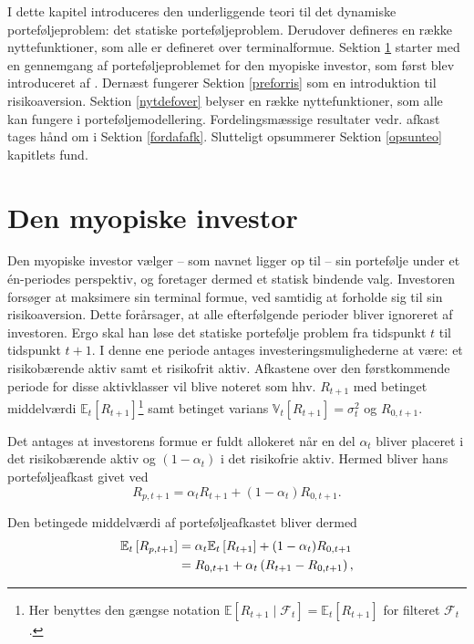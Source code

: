 \documentclass[
  a4paper,
  oneside]{memoir}
\begin{document}
I dette kapitel introduceres den underliggende teori til det dynamiske porteføljeproblem: det statiske porteføljeproblem. Derudover defineres en række nyttefunktioner, som alle er defineret over terminalformue. Sektion \ref{myoinv} starter med en gennemgang af porteføljeproblemet for den myopiske investor, som først blev introduceret af \citep{Markowitz1952}. Dernæst fungerer Sektion \ref{preforris} som en introduktion til risikoaversion. Sektion \ref{nytdefover} belyser en række nyttefunktioner, som alle kan fungere i porteføljemodellering. Fordelingsmæssige resultater vedr. afkast tages hånd om i Sektion \ref{fordafafk}. Slutteligt opsummerer Sektion \ref{opsunteo} kapitlets fund.

\hypertarget{myoinv}{%
\section{Den myopiske investor}\label{myoinv}}

Den myopiske investor vælger -- som navnet ligger op til -- sin portefølje under et én-periodes perspektiv, og foretager dermed et statisk bindende valg. Investoren forsøger at maksimere sin terminal formue, ved samtidig at forholde sig til sin risikoaversion. Dette forårsager, at alle efterfølgende perioder bliver ignoreret af investoren. Ergo skal han løse det statiske portefølje problem fra tidspunkt \(t\) til tidspunkt \(t+1\). I denne ene periode antages investeringsmulighederne at være: et risikobærende aktiv samt et risikofrit aktiv. Afkastene over den førstkommende periode for disse aktivklasser vil blive noteret som hhv. \(R_{t+1}\) med betinget middelværdi \(\mathbb{E}_t\left[R_{t+1}\right]\)\footnote{Her benyttes den gængse notation \(\mathbb{E}\left[R_{t+1}\mid \mathcal{F}_t\right]=\mathbb{E}_t\left[R_{t+1}\right]\) for filteret \(\mathcal{F}_t\).} samt betinget varians \(\mathbb{V}_t\left[R_{t+1}\right]=\sigma_t^2\) og \(R_{0,t+1}\).

Det antages at investorens formue er fuldt allokeret når en del \(\alpha_t\) bliver placeret i det risikobærende aktiv og \((1-\alpha_t)\) i det risikofrie aktiv. Hermed bliver hans porteføljeafkast givet ved
\begin{equation}
R_{p,t+1}=\alpha_t R_{t+1}+\left(1-\alpha_t\right)R_{0,t+1}.\label{eq:Portafk}
\end{equation}

Den betingede middelværdi af porteføljeafkastet bliver dermed
\begin{align}
\mathbb{E}_t\left[R_{p,t+1}\right]&=\alpha_t\mathbb{E}_t\left[R_{t+1}\right]+(1-\alpha_t)R_{0,t+1} \notag\\ 
&=R_{0,t+1}+ \alpha_t\left(R_{t+1} - R_{0,t+1}\right),\label{eq:Forvport}
\end{align}
\end{document}
